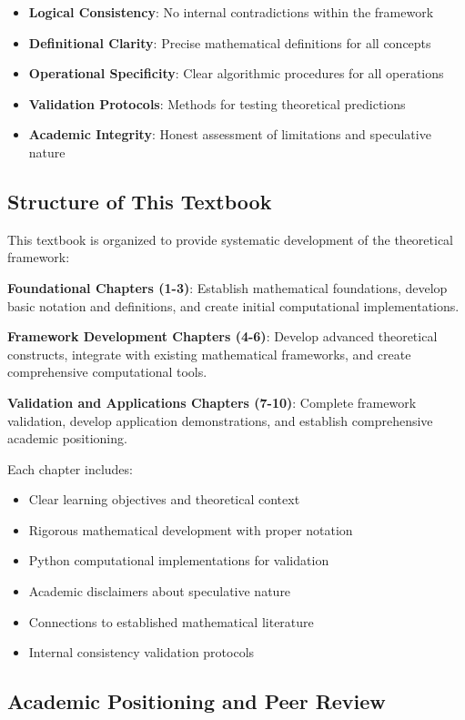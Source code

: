 \begin{itemize}
\item \textbf{Logical Consistency}: No internal contradictions within the framework
\item \textbf{Definitional Clarity}: Precise mathematical definitions for all concepts
\item \textbf{Operational Specificity}: Clear algorithmic procedures for all operations
\item \textbf{Validation Protocols}: Methods for testing theoretical predictions
\item \textbf{Academic Integrity}: Honest assessment of limitations and speculative nature
\end{itemize}

\subsection{Structure of This Textbook}

This textbook is organized to provide systematic development of the theoretical framework:

\textbf{Foundational Chapters (1-3)}: Establish mathematical foundations, develop basic notation and definitions, and create initial computational implementations.

\textbf{Framework Development Chapters (4-6)}: Develop advanced theoretical constructs, integrate with existing mathematical frameworks, and create comprehensive computational tools.

\textbf{Validation and Applications Chapters (7-10)}: Complete framework validation, develop application demonstrations, and establish comprehensive academic positioning.

Each chapter includes:
\begin{itemize}
\item Clear learning objectives and theoretical context
\item Rigorous mathematical development with proper notation
\item Python computational implementations for validation
\item Academic disclaimers about speculative nature
\item Connections to established mathematical literature
\item Internal consistency validation protocols
\end{itemize}

\subsection{Academic Positioning and Peer Review}

